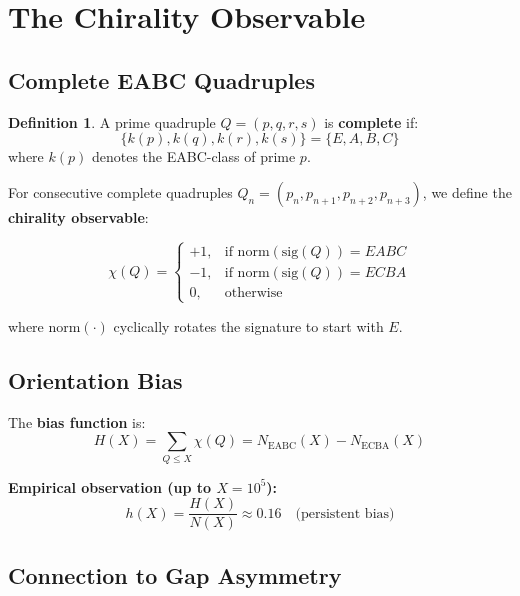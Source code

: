\documentclass[11pt,a4paper]{article}
\theoremstyle{definition}
\newtheorem{definition}[theorem]{Definition}
\theoremstyle{remark}
\begin{document}
\section{The Chirality Observable}

\subsection{Complete EABC Quadruples}

\begin{definition}
A prime quadruple $Q = (p, q, r, s)$ is \textbf{complete} if:
\begin{equation}
\{k(p), k(q), k(r), k(s)\} = \{E, A, B, C\}
\end{equation}
where $k(p)$ denotes the EABC-class of prime $p$.
\end{definition}

For consecutive complete quadruples $Q_n = (p_n, p_{n+1}, p_{n+2}, p_{n+3})$, we define the \textbf{chirality observable}:

\begin{equation}
\chi(Q) = \begin{cases}
+1, & \text{if norm}(\text{sig}(Q)) = EABC \\
-1, & \text{if norm}(\text{sig}(Q)) = ECBA \\
0, & \text{otherwise}
\end{cases}
\end{equation}

where norm$(\cdot)$ cyclically rotates the signature to start with $E$.

\subsection{Orientation Bias}

The \textbf{bias function} is:
\begin{equation}
H(X) = \sum_{Q \leq X} \chi(Q) = N_{\text{EABC}}(X) - N_{\text{ECBA}}(X)
\end{equation}

\textbf{Empirical observation (up to $X = 10^5$):}
\begin{equation}
h(X) = \frac{H(X)}{N(X)} \approx 0.16 \quad \text{(persistent bias)}
\end{equation}

\subsection{Connection to Gap Asymmetry}
\end{document}
